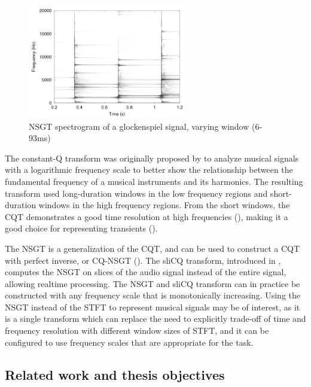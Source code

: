\documentclass[report.tex]{subfiles}
\begin{document}
\begin{figure}[ht]
	\centering
	\includegraphics[height=5cm]{./images-tftheory/tf_tradeoff_balasz3.png}
	\caption{NSGT spectrogram of a glockenspiel signal, varying window (6-93ms)}
	\label{fig:nsgttradeoff}
\end{figure}

The constant-Q transform was originally proposed by \textcite{jbrown} to analyze musical signals with a logarithmic frequency scale to better show the relationship between the fundamental frequency of a musical instruments and its harmonics. The resulting transform used long-duration windows in the low frequency regions and short-duration windows in the high frequency regions. From the short windows, the CQT demonstrates a good time resolution at high frequencies (\cite{cqtransient}), making it a good choice for representing transients (\cite[Chapter~2]{}).

The NSGT is a generalization of the CQT, and can be used to construct a CQT with perfect inverse, or CQ-NSGT (\cite{invertiblecqt, variableq1}). The sliCQ transform, introduced in \textcite{invertiblecqt}, computes the NSGT on slices of the audio signal instead of the entire signal, allowing realtime processing. The NSGT and sliCQ transform can in practice be constructed with any frequency scale that is monotonically increasing. Using the NSGT instead of the STFT to represent musical signals may be of interest, as it is a single transform which can replace the need to explicitly trade-off of time and frequency resolution with different window sizes of STFT, and it can be configured to use frequency scales that are appropriate for the task.

\subsection{Related work and thesis objectives}

\end{document}
